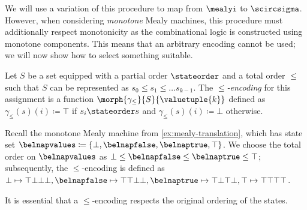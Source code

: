 \documentclass{lmcs}
\begin{document}
We will use a variation of this procedure to map from \(\mealyi\) to
\(\scircsigma\).
However, when considering \emph{monotone} Mealy machines, this procedure must
additionally respect monotonicity as the combinational logic is constructed
using monotone components.
This means that an arbitrary encoding cannot be used; we will now show how to
select something suitable.

\begin{defi}[Encoding]\label{def:encoding}
    Let \(S\) be a set equipped with a partial order \(\stateorder\) and a total
    order \(\leq\) such that \(S\) can be represented as
    \(s_0 \leq s_1 \leq \dots s_{k-1}\).
    The \emph{\(\leq\)-encoding} for this assignment is a function
    \(\morph{\gamma_\leq}{S}{\valuetuple{k}}\) defined as
    \(\gamma_\leq(s)(i) \coloneqq \top\) if \(s_i \stateorder s\) and
    \(\gamma_\leq(s)(i) \coloneqq \bot\) otherwise.
\end{defi}

\begin{exa}
    Recall the monotone Mealy machine from \autoref{ex:mealy-translation}, which
    has state set \(
    \belnapvalues \coloneqq \{\bot,\belnapfalse,\belnaptrue,\top\}
    \).
    We choose the total order on \(\belnapvalues\) as
    \(\bot \leq \belnapfalse \leq \belnaptrue \leq \top\); subsequently, the
    \(\leq\)-encoding is defined as \(
    \bot \mapsto \top\bot\bot\bot, \belnapfalse \mapsto \top\top\bot\bot,
    \belnaptrue \mapsto \top\bot\top\bot, \top \mapsto \top\top\top\top
    \).
\end{exa}

It is essential that a \(\leq\)-encoding respects the original ordering of the
states.
\end{document}
